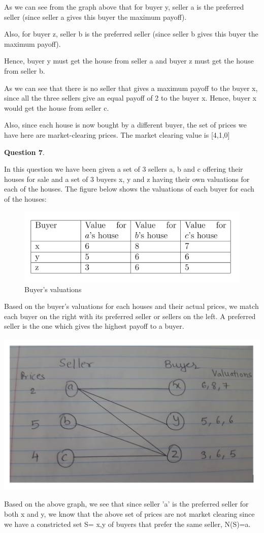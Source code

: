 \documentclass[twoside]{report}
\begin{document}
As we can see from the graph above that for buyer y, seller a is the preferred seller (since seller a gives this buyer the maximum payoff).

Also, for buyer z, seller b is the preferred seller (since seller b gives this buyer the maximum payoff).

Hence, buyer y must get the house from seller a and buyer z must get the house from seller b.

As we can see that there is no seller that gives a maximum payoff to the buyer x, since all the three sellers give an equal payoff of 2 to the buyer x. Hence, buyer x would get the house from seller c.

Also, since each house is now bought by a different buyer, the set of prices we have here are market-clearing prices. The market clearing value is [4,1,0]



\textbf{Question 7}.

In this question we have been given a set of 3 sellers a, b and c offering their houses for sale and a set of 3 buyers x, y and z having their own valuations for each of the houses. The figure below shows the valuations of each buyer for each of the houses:

\begin{figure}[htp]
\centering
\includegraphics{Q7}
\caption{Buyer's valuations}
\end{figure}

Based on the buyer's valuations for each houses and their actual prices, we match each buyer on the right with its preferred seller or sellers on the left. A preferred seller is the one which gives the highest payoff to a buyer.


{\centering
 \includegraphics{Q7-1}\par
}
Based on the above graph, we see that since seller 'a' is the preferred seller for both x and y, we know that the above set of prices are not market clearing since we have a constricted set S= {x,y} of buyers that prefer the same seller, N(S)={a}.
\end{document}
